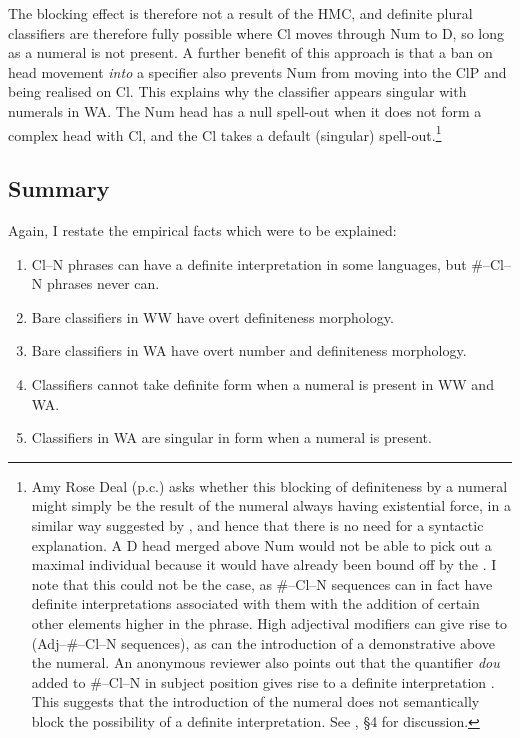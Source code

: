 \documentclass[output=paper
,modfonts
,nonflat]{langsci/langscibook}
\begin{document}
The blocking effect is therefore not a result of the HMC, and definite plural classifiers are therefore fully possible where Cl moves through Num to D, so long as a numeral is not present. A further benefit of this approach is that a ban on head movement \textit{into} a specifier also prevents Num from moving into the ClP and being realised on Cl. This explains why the classifier appears singular with numerals in WA. The Num head has a null spell-out when it does not form a complex head with Cl, and the Cl takes a default (singular) spell-out.\footnote{Amy Rose Deal (p.c.) asks whether this blocking of definiteness by a numeral might simply be the result of the numeral always having existential force, in a similar way suggested by \citeauthor{ChengSybesma1999}, and hence that there is no need for a syntactic explanation. A D head merged above Num would not be able to pick out a maximal individual because it would have already been bound off by the . I note that this could not be the case, as \#--Cl--N sequences can in fact have definite interpretations associated with them with the addition of certain other elements higher in the phrase. High adjectival modifiers can give rise to  (Adj--\#--Cl--N sequences), as can the introduction of a demonstrative above the numeral. An anonymous reviewer also points out that the quantifier \textit{dou} added to \#--Cl--N in subject position gives rise to a definite interpretation \citep{Cheng2009}. This suggests that the introduction of the numeral does not semantically block the possibility of a definite interpretation. See \citet{Hall2015}, \S 4 for discussion.}

\subsection{Summary}

Again, I restate the empirical facts which were to be explained:

\begin{enumerate}
\item Cl--N phrases can have a definite interpretation in some languages, but \#--Cl--N phrases never can.
\item Bare classifiers in WW have overt definiteness morphology.
\item Bare classifiers in WA have overt number and definiteness morphology.
\item Classifiers cannot take definite form when a numeral is present in WW and WA.
\item Classifiers in WA are singular in form when a numeral is present.
\end{enumerate}
\end{document}
